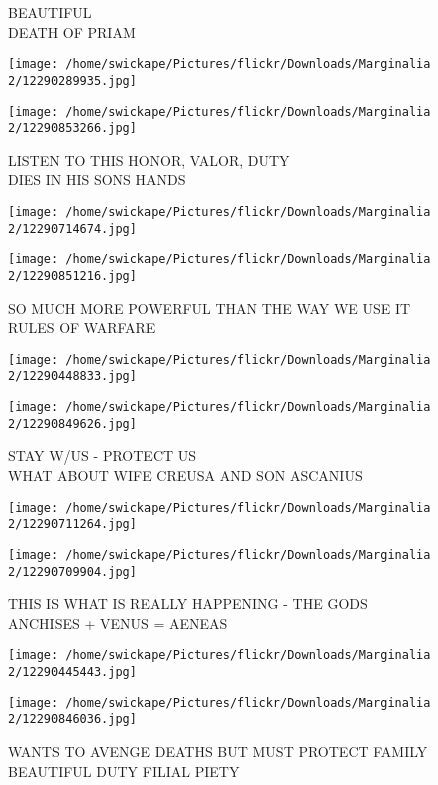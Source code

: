 \documentclass[10pt,letterpaper]{article}
\begin{document}
BEAUTIFUL\\
DEATH OF PRIAM
\pagebreak

\texttt{[image: /home/swickape/Pictures/flickr/Downloads/Marginalia 2/12290289935.jpg]}

\vspace{0.25in}
\texttt{[image: /home/swickape/Pictures/flickr/Downloads/Marginalia 2/12290853266.jpg]}

LISTEN TO THIS HONOR, VALOR, DUTY\\
DIES IN HIS SONS HANDS
\pagebreak

\texttt{[image: /home/swickape/Pictures/flickr/Downloads/Marginalia 2/12290714674.jpg]}

\vspace{0.25in}
\texttt{[image: /home/swickape/Pictures/flickr/Downloads/Marginalia 2/12290851216.jpg]}

SO MUCH MORE POWERFUL THAN THE WAY WE USE IT\\
RULES OF WARFARE
\pagebreak

\texttt{[image: /home/swickape/Pictures/flickr/Downloads/Marginalia 2/12290448833.jpg]}

\vspace{0.25in}
\texttt{[image: /home/swickape/Pictures/flickr/Downloads/Marginalia 2/12290849626.jpg]}

STAY W/US {-} PROTECT US\\
WHAT ABOUT WIFE CREUSA AND SON ASCANIUS
\pagebreak

\texttt{[image: /home/swickape/Pictures/flickr/Downloads/Marginalia 2/12290711264.jpg]}

\vspace{0.25in}
\texttt{[image: /home/swickape/Pictures/flickr/Downloads/Marginalia 2/12290709904.jpg]}

THIS IS WHAT IS REALLY HAPPENING {-} THE GODS\\
ANCHISES + VENUS = AENEAS
\pagebreak

\texttt{[image: /home/swickape/Pictures/flickr/Downloads/Marginalia 2/12290445443.jpg]}

\vspace{0.25in}
\texttt{[image: /home/swickape/Pictures/flickr/Downloads/Marginalia 2/12290846036.jpg]}

WANTS TO AVENGE DEATHS BUT MUST PROTECT FAMILY\\
BEAUTIFUL DUTY FILIAL PIETY
\pagebreak
\end{document}
